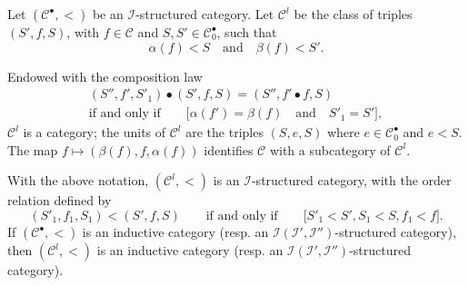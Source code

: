 \documentclass[a4paper,fleqn]{article}
\theoremstyle{plain}
\newenvironment{proposition}[1]
  {\renewcommand\theinnerproposition{#1}\innerproposition}
  {\endinnerproposition}
\theoremstyle{definition}
\newcommand{\textand}{\quad\text{and}\quad}
\newcommand{\CC}{\mathcal{C}}
\newcommand{\II}{\mathcal{I}}
\newcommand{\smallbullet}{\bullet}
\begin{document}
Let $(\CC^\smallbullet,<)$ be an $\II$-structured category.
Let $\CC^l$ be the class of triples $(S',f,S)$, with $f\in\CC$ and $S,S'\in\CC_0^\smallbullet$, such that
\[
  \alpha(f)<S
  \textand
  \beta(f)<S'.
\]

Endowed with the composition law
\[
  \begin{gathered}
    (S'',f',S'_1)\smallbullet(S',f,S)
    = (S'',f'\smallbullet f,S)
  \\\text{if and only if}\qquad
    \big[\alpha(f')=\beta(f)\textand S'_1=S'\big],
  \end{gathered}
\]
$\CC^l$ is a category;
the units of $\CC^l$ are the triples $(S,e,S)$ where $e\in\CC_0^\smallbullet$ and $e<S$.
The map $f\mapsto(\beta(f),f,\alpha(f))$ identifies $\CC$ with a subcategory of $\CC^l$.

\begin{proposition}{26}
\label{proposition:ii-26}
  With the above notation, $(\CC^l,<)$ is an $\II$-structured category, with the order relation defined by
  \[
    (S'_1,f_1,S_1)<(S',f,S)
    \qquad\text{if and only if}\qquad
    \big[
      S'_1<S', S_1<S, f_1<f
    \big].
  \]
  If $(\CC^\smallbullet,<)$ is an inductive category (resp. an $\II(\II',\II'')$-structured category), then $(\CC^l,<)$ is an inductive category (resp. an $\II(\II',\II'')$-structured category).
\end{proposition}
\end{document}

